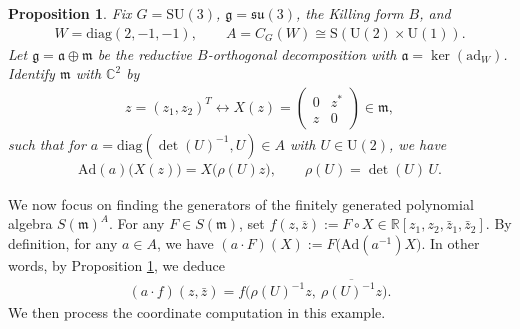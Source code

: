 \documentclass[11pt]{amsart}
\newtheorem{proposition}[theorem]{Proposition}
\theoremstyle{definition}
\theoremstyle{plain}
\theoremstyle{conclusion}
\begin{document}
\begin{proposition}
\label{prop:Adaction}
Fix $G=\mathrm{SU}(3)$, $\mathfrak{g}=\mathfrak{su}(3)$, the Killing form $B$, and
\begin{align*}
W=\mathrm{diag}(2,-1,-1),\qquad A=C_G(W)\cong  \mathrm{S}(\mathrm{U}(2)\times \mathrm{U}(1)).
\end{align*}
Let $\mathfrak{g}=\mathfrak{a}\oplus\mathfrak{m}$ be the reductive $B$-orthogonal decomposition with $\mathfrak{a}=\ker(\mathrm{ad}_W)$. Identify $\mathfrak{m}$ with $\mathbb{C}^2$ by \begin{align*}
z=(z_1,z_2)^T\longleftrightarrow X(z)=\begin{pmatrix}0 & z^*\\[2pt] z & 0\end{pmatrix}\in\mathfrak{m},
\end{align*} such that for $a=\mathrm{diag}(\det(U)^{-1},U)\in A$ with $U\in \mathrm{U}(2)$, we have
\begin{align*}
\mathrm{Ad}(a)\bigl(X(z)\bigr)=X\bigl(\rho(U)z\bigr),\qquad \rho(U) =\det(U)\,U.
\end{align*}
\end{proposition}

 We now focus on finding the generators of the finitely generated polynomial algebra $S(\mathfrak{m})^A$. For any $F\in S(\mathfrak{m})$, set $f (z,\overline{z}):=F\circ X\in\mathbb{R}[z_1,z_2,\bar z_1,\bar z_2]$. By definition,  for any $a \in A$, we have $(a\cdot F)(X):=F\bigl(\mathrm{Ad}(a^{-1})X\bigr)$. In other words, by Proposition \ref{prop:Adaction}, we deduce \begin{align}
    (a\cdot f)(z,\bar z)=f \bigl(\rho(U)^{-1}z,\ \overline{\rho(U)^{-1}z}\bigr).
\end{align}  We then process the coordinate computation in this example.
\end{document}
